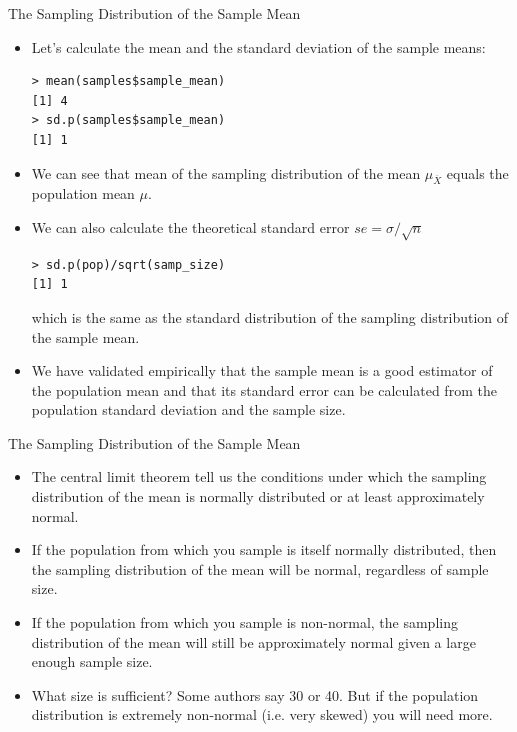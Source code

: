 \documentclass[handout]{beamer}
\begin{document}
\begin{frame}[fragile]{The Sampling Distribution of the Sample Mean}
\scriptsize{
\begin{itemize}
\item Let's calculate the mean and the standard deviation of the sample means:
\begin{verbatim}
> mean(samples$sample_mean)
[1] 4
> sd.p(samples$sample_mean)
[1] 1
\end{verbatim}

\item We can see that mean of the sampling distribution of the mean $\mu_{\overline{X}}$ equals the population mean $\mu$.


\item We can also calculate the theoretical standard error $se=\sigma/\sqrt{n}$

\begin{verbatim}
> sd.p(pop)/sqrt(samp_size)
[1] 1
\end{verbatim}

which is the same as the standard distribution of the sampling distribution of the sample mean.

\item We have validated empirically that the sample mean is a good estimator of the population mean and that its standard error can be calculated from the population standard deviation and the sample size.

\end{itemize}



} 
\end{frame}


\begin{frame}[fragile]{The Sampling Distribution of the Sample Mean}
\scriptsize{

\begin{itemize}
\item The central limit theorem tell us the conditions under which the sampling distribution of the mean is normally distributed or at least approximately normal.
\item If the population from which you sample is itself normally distributed, then the sampling distribution of the mean will be normal, regardless of sample size.
\item If the population from which you sample is non-normal, the sampling distribution of the mean will still be approximately normal given a large enough sample size.
\item What size is sufficient? Some authors say 30 or 40. But if the population distribution is extremely non-normal (i.e. very skewed) you will need more.
\end{itemize}


} 
\end{frame}
\end{document}

